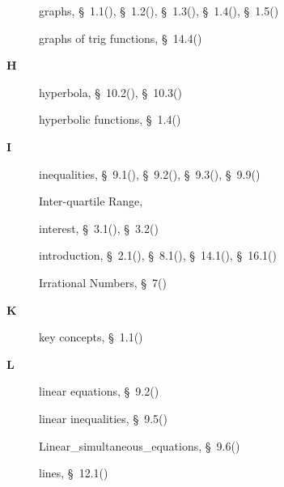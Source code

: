 \begin{multicols}{2}
{\begin{description}
	  \item[] \noindent\raggedright graphs,  \S~1.1(\pageref{m39337}),  \S~1.2(\pageref{m39338}),  \S~1.3(\pageref{m39345}),  \S~1.4(\pageref{m39341}),  \S~1.5(\pageref{m39348})
	  
	  \item[] \noindent\raggedright graphs of trig functions,  \S~14.4(\pageref{m39414})
	  \vspace{.3cm}
	  \item[{\large \bfseries H}]\noindent\raggedright
	  hyperbola,  \S~10.2(\pageref{m39223}),  \S~10.3(\pageref{m39240})
	  
	  \item[] \noindent\raggedright hyperbolic functions,  \S~1.4(\pageref{m39341})
	  \vspace{.3cm}
	  \item[{\large \bfseries I}]\noindent\raggedright
	  inequalities,  \S~9.1(\pageref{m39250}),  \S~9.2(\pageref{m39241}),  \S~9.3(\pageref{m39247}),  \S~9.9(\pageref{m39263})
	  
	  \item[] \noindent\raggedright Inter-quartile Range,  \pageref{id2623786}
	  
	  \item[] \noindent\raggedright interest,  \S~3.1(\pageref{m39332}),  \S~3.2(\pageref{m39334})
	  
	  \item[] \noindent\raggedright introduction,  \S~2.1(\pageref{m39364}),  \S~8.1(\pageref{m39383}),  \S~14.1(\pageref{m39405}),  \S~16.1(\pageref{m39403})
	  
	  \item[] \noindent\raggedright Irrational Numbers,  \S~7(\pageref{m38349})
	  \vspace{.3cm}
	  \item[{\large \bfseries K}]\noindent\raggedright
	  key concepts,  \S~1.1(\pageref{m39337})
	  \vspace{.3cm}
	  \item[{\large \bfseries L}]\noindent\raggedright
	  linear equations,  \S~9.2(\pageref{m39241})
	  
	  \item[] \noindent\raggedright linear inequalities,  \S~9.5(\pageref{m39254})
	  
	  \item[] \noindent\raggedright Linear\_simultaneous\_equations,  \S~9.6(\pageref{m39257})
	  
	  \item[] \noindent\raggedright lines,  \S~12.1(\pageref{m39370})
	  

\end{description}}
\end{multicols}
